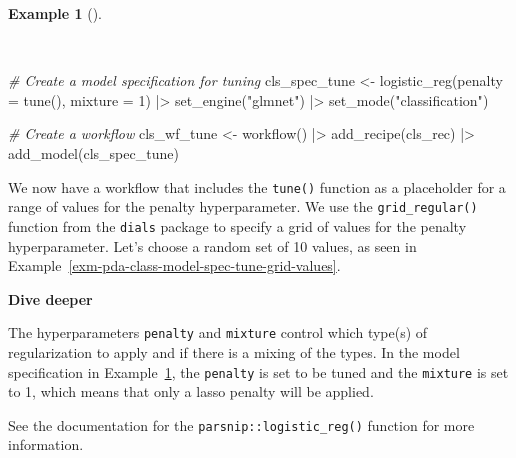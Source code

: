 \documentclass[
  letterpaper,
  DIV=11,
  numbers=noendperiod]{scrreprt}
\newenvironment{Shaded}{\begin{snugshade}}{\end{snugshade}}
\newcommand{\AttributeTok}[1]{\textcolor[rgb]{0.00,0.00,0.00}{#1}}
\newcommand{\CommentTok}[1]{\textcolor[rgb]{0.00,0.00,0.00}{\textit{#1}}}
\newcommand{\DecValTok}[1]{\textcolor[rgb]{0.00,0.00,0.00}{#1}}
\newcommand{\FunctionTok}[1]{\textcolor[rgb]{0.00,0.00,0.00}{#1}}
\newcommand{\NormalTok}[1]{\textcolor[rgb]{0.00,0.00,0.00}{#1}}
\newcommand{\OtherTok}[1]{\textcolor[rgb]{0.00,0.00,0.00}{#1}}
\newcommand{\SpecialCharTok}[1]{\textcolor[rgb]{0.00,0.00,0.00}{#1}}
\newcommand{\StringTok}[1]{\textcolor[rgb]{0.00,0.00,0.00}{#1}}
\theoremstyle{definition}
\newtheorem{example}{Example}[chapter]
\theoremstyle{remark}
\begin{document}
\begin{example}[]\protect\hypertarget{exm-pda-class-model-spec-tune}{}\label{exm-pda-class-model-spec-tune}

~

\begin{Shaded}
\begin{Highlighting}[]
\CommentTok{\# Create a model specification for tuning}
\NormalTok{cls\_spec\_tune }\OtherTok{\textless{}{-}}
  \FunctionTok{logistic\_reg}\NormalTok{(}\AttributeTok{penalty =} \FunctionTok{tune}\NormalTok{(), }\AttributeTok{mixture =} \DecValTok{1}\NormalTok{) }\SpecialCharTok{|\textgreater{}}
  \FunctionTok{set\_engine}\NormalTok{(}\StringTok{"glmnet"}\NormalTok{) }\SpecialCharTok{|\textgreater{}}
  \FunctionTok{set\_mode}\NormalTok{(}\StringTok{"classification"}\NormalTok{)}

\CommentTok{\# Create a workflow}
\NormalTok{cls\_wf\_tune }\OtherTok{\textless{}{-}}
  \FunctionTok{workflow}\NormalTok{() }\SpecialCharTok{|\textgreater{}}
  \FunctionTok{add\_recipe}\NormalTok{(cls\_rec) }\SpecialCharTok{|\textgreater{}}
  \FunctionTok{add\_model}\NormalTok{(cls\_spec\_tune)}
\end{Highlighting}
\end{Shaded}

\end{example}

We now have a workflow that includes the \texttt{tune()} function as a
placeholder for a range of values for the penalty hyperparameter. We use
the \texttt{grid\_regular()} function from the \texttt{dials} package to
specify a grid of values for the penalty hyperparameter. Let's choose a
random set of 10 values, as seen in
Example~\ref{exm-pda-class-model-spec-tune-grid-values}.

\begin{tcolorbox}[enhanced jigsaw, leftrule=.75mm, colframe=quarto-callout-color-frame, colback=white, rightrule=.15mm, opacityback=0, arc=.35mm, breakable, bottomrule=.15mm, left=2mm, toprule=.15mm]

\textbf{ Dive deeper}

The hyperparameters \texttt{penalty} and \texttt{mixture} control which
type(s) of regularization to apply and if there is a mixing of the
types. In the model specification in
Example~\ref{exm-pda-class-model-spec-tune}, the \texttt{penalty} is set
to be tuned and the \texttt{mixture} is set to 1, which means that only
a lasso penalty will be applied.

See the documentation for the \texttt{parsnip::logistic\_reg()} function
for more information.

\end{tcolorbox}
\end{document}
